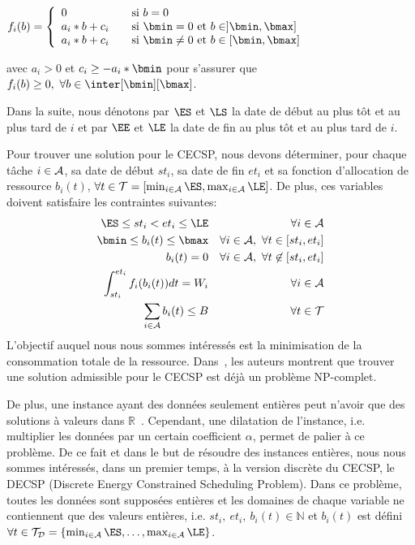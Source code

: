 \noindent
  $f_i(b)=\left\{
    \begin{array}{ll} 0 & \quad \text{si }b=0\\ a_i*b+c_i &\quad
                                                            \text{si }\bmin=0\text{ et }b \in ]\bmin,\bmax] \\ a_i*b+c_i &\quad
                                                                                                                           \text{si }\bmin\neq 0 \text{ et }b \in [\bmin,\bmax]
    \end{array} \right.$ 
  
  \noindent
  avec $a_i>0$ et $c_i \geq -a_i*\bmin $ pour
  s'assurer que $f_i(b) \geq 0,\ \forall b \in \inter[\bmin][\bmax]$.

Dans la suite, nous dénotons par $\ES$ et $\LS$
la date de début au plus tôt et au plus tard de $i$ et par
$\EE$ et $\LE$ la date de fin au plus tôt et au
plus tard de $i$.

Pour trouver une solution pour le CECSP, nous devons déterminer, pour
chaque tâche $i \in {\cal A}$, sa date de début $st_i$, sa date de fin
$et_i$ et sa fonction d'allocation de ressource $b_i(t)$, $\forall t
\in {\cal T}=[\min_{i\in{\cal A}} \ES, \max_{i\in {\cal
    A}} \LE]$. De plus, ces variables doivent satisfaire
les contraintes suivantes:
\begin{eqnarray} 
  \ES\le st_i < et_i \le \LE & & \forall i \in
{\cal A} \label {tw_CECSP}\\
  \bmin \le b_i(t) \le \bmax & & \forall i \in {\cal A},\
\forall t \in [st_i,et_i] \label {bminmax_CECSP}\\
  b_i(t)=0 & & \forall i \in {\cal A},\ \forall t \not\in
[st_i,et_i] \label {b0_CECSP}\\
  \int_{st_i}^{et_i} f_i(b_i(t))dt =W_i & & \forall i \in {\cal
A} \label{nrj_CECSP}\\
  \sum_{i \in {\cal A}} b_i(t) \le B & & \forall t \in {\cal
T} \label{res_CECSP}
\end{eqnarray}
L'objectif auquel nous nous sommes intéressés est la minimisation de
la consommation totale de la ressource. Dans~\cite{Nattaf2015}, les
auteurs montrent que trouver une solution admissible pour le CECSP est
déjà un problème NP-complet. 

De plus, une instance ayant des données seulement entières peut
n'avoir que des solutions à valeurs dans
$\mathbb{R}$~\cite{Nattaf2015}. Cependant, une dilatation de
l'instance, i.e. multiplier les données par un certain coefficient
$\alpha$, permet de palier à ce problème. 
De ce fait et dans le but de résoudre des instances entières, nous
nous sommes intéressés, dans un premier temps, à la version discrète
du CECSP, le DECSP (Discrete Energy Constrained Scheduling
Problem). Dans ce problème, toutes les données sont supposées entières
et les domaines de chaque variable ne contiennent
que des valeurs entières, i.e. $st_i,\ et_i,\ b_i(t) \in \mathbb{N}$ et
$b_i(t)$ est défini $\forall t \in {\cal T}_{\cal D}=\{\min_{i\in{\cal
A}} \ES,\dots, \max_{i\in {\cal A}} \LE\}$. 

